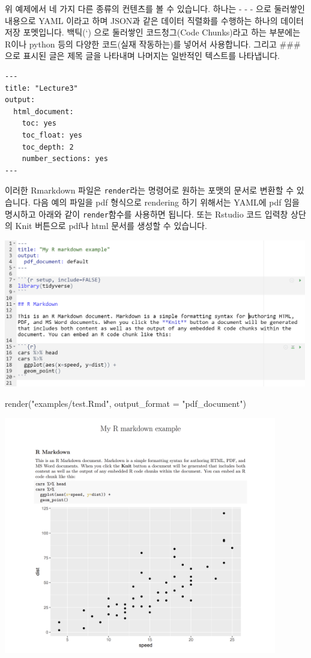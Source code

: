 \documentclass[
]{book}
\newenvironment{Shaded}{\begin{snugshade}}{\end{snugshade}}
\newcommand{\AttributeTok}[1]{\textcolor[rgb]{0.77,0.63,0.00}{#1}}
\newcommand{\FunctionTok}[1]{\textcolor[rgb]{0.00,0.00,0.00}{#1}}
\newcommand{\NormalTok}[1]{#1}
\newcommand{\StringTok}[1]{\textcolor[rgb]{0.31,0.60,0.02}{#1}}
\begin{document}
위 예제에서 네 가지 다른 종류의 컨텐츠를 볼 수 있습니다. 하나는 - - - 으로 둘러쌓인 내용으로 YAML 이라고 하며 JSON과 같은 데이터 직렬화를 수행하는 하나의 데이터 저장 포멧입니다. 백틱(`) 으로 둘러쌓인 코드청그(Code Chunks)라고 하는 부분에는 R이나 python 등의 다양한 코드(실재 작동하는)를 넣어서 사용합니다. 그리고 \#\#\# 으로 표시된 글은 제목 글을 나타내며 나머지는 일반적인 텍스트를 나타냅니다.

\begin{verbatim}
---
title: "Lecture3"
output:
  html_document:
    toc: yes
    toc_float: yes
    toc_depth: 2
    number_sections: yes
---
\end{verbatim}

이러한 Rmarkdown 파일은 \texttt{render}라는 명령어로 원하는 포맷의 문서로 변환할 수 있습니다. 다음 예의 파일을 pdf 형식으로 rendering 하기 위해서는 YAML에 pdf 임을 명시하고 아래와 같이 \texttt{render}함수를 사용하면 됩니다. 또는 Rstudio 코드 입력창 상단의 Knit 버튼으로 pdf나 html 문서를 생성할 수 있습니다.

\includegraphics[width=5.20833in,height=\textheight]{images/rmarkdown/example2.PNG}

\begin{Shaded}
\begin{Highlighting}[]
\FunctionTok{render}\NormalTok{(}\StringTok{"examples/test.Rmd"}\NormalTok{, }\AttributeTok{output\_format =} \StringTok{"pdf\_document"}\NormalTok{)}
\end{Highlighting}
\end{Shaded}

\includegraphics[width=4.6875in,height=\textheight]{images/rmarkdown/ex_pdf.PNG}
\end{document}
